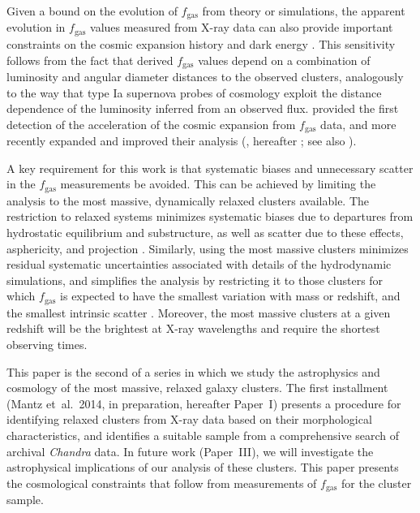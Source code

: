 \documentclass[useAMS,usenatbib,usegraphicx]{mn2e}
\newcommand*{\mysub}[2]{\ensuremath{#1_{\mathrm{#2}}}}
\newcommand*{\fgas}{\mysub{f}{gas}}
\newcommand*{\Chandra}{{\it Chandra}}
\newcommand*{\arsemf}{\citetalias{Allen0706.0033}}
\newcommand*{\morphpaper}{Paper~I}
\newcommand*{\profilespaper}{Paper~III}
\begin{document}
Given a bound on the evolution of \fgas{} from theory or simulations, the apparent evolution in \fgas{} values measured from X-ray data can also provide important constraints on the cosmic expansion history and dark energy \citep{Sasaki9611033, Pen9610090}. This sensitivity follows from the fact that derived \fgas{} values depend on a combination of luminosity and angular diameter distances to the observed clusters, analogously to the way that type Ia supernova probes of cosmology exploit the distance dependence of the luminosity inferred from an observed flux. \citet{Allen0405340} provided the first detection  of the acceleration of the cosmic expansion from \fgas{} data, and more recently expanded and improved their analysis (\citealt{ Allen0706.0033}, hereafter \arsemf{}; see also \citealt{LaRoque0604039, Ettori0904.2740}).

A key requirement for this work is that systematic biases and unnecessary scatter in the \fgas{} measurements be avoided. This can be achieved by limiting the analysis to the most massive, dynamically relaxed clusters available. The restriction to relaxed systems minimizes systematic biases due to departures from hydrostatic equilibrium and substructure, as well as scatter due to these effects, asphericity, and projection \citep{Rasia0602434, Nagai0703661, Battaglia1209.4082}. Similarly, using the most massive clusters minimizes residual systematic uncertainties associated with details of the hydrodynamic simulations, and simplifies the analysis by restricting it to those clusters for which \fgas{} is expected to have the smallest variation with mass or redshift, and the smallest intrinsic scatter \citep{Eke9708070, Kay0407058, Crain0610602, Nagai0609247,  Stanek0910.1599, Young1007.0887, Borgani0906.4370, Battaglia1209.4082, Planelles1209.5058, Sembolini1207.4438}. Moreover, the most massive clusters at a given redshift will be the brightest at X-ray wavelengths and require the shortest observing times.

This paper is the second of a series in which we study the astrophysics and cosmology of the most massive, relaxed galaxy clusters. The first installment (Mantz et~al.\ 2014, in preparation, hereafter \morphpaper{}) presents a procedure for identifying relaxed clusters from X-ray data based on their morphological characteristics, and identifies a suitable sample from a comprehensive search of archival \Chandra{} data. In future work (\profilespaper), we will investigate the astrophysical implications of our analysis of these clusters. This paper presents the cosmological constraints that follow from measurements of \fgas{} for the cluster sample.
\end{document}
